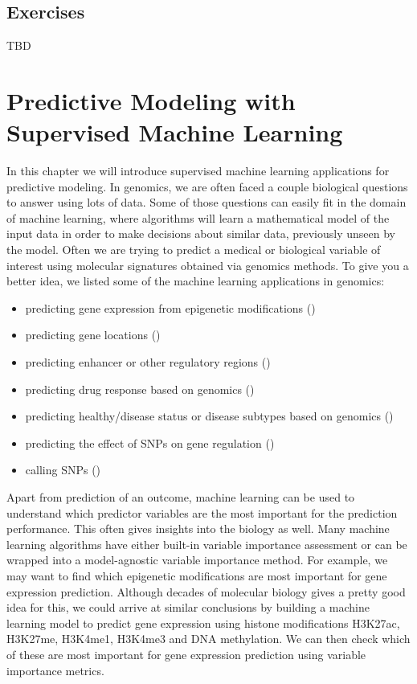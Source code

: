 \documentclass[12pt,]{krantz}
\providecommand{\tightlist}{%
  \setlength{\itemsep}{0pt}\setlength{\parskip}{0pt}}
\begin{document}
\hypertarget{exercises-2}{%
\section{Exercises}\label{exercises-2}}

TBD

\hypertarget{supervisedLearning}{%
\chapter{Predictive Modeling with Supervised Machine Learning}\label{supervisedLearning}}

In this chapter we will introduce supervised machine learning applications for predictive modeling. In genomics, we are often faced a couple biological questions to answer using lots of data. Some of those questions can easily fit in the domain of machine learning, where algorithms will learn a mathematical model of the input data in order to make decisions about similar data, previously unseen by the model. Often we are trying to predict a medical or biological variable of interest using molecular signatures obtained via genomics methods. To give you a better idea, we listed some of the machine learning applications in genomics:

\begin{itemize}
\tightlist
\item
  predicting gene expression from epigenetic modifications (\citet{pmid22950368})
\item
  predicting gene locations (\citet{pmid12364589})
\item
  predicting enhancer or other regulatory regions (\citet{pmid22328731})
\item
  predicting drug response based on genomics (\citet{pmid21428770})
\item
  predicting healthy/disease status or disease subtypes based on genomics (\citet{pmid25750696})
\item
  predicting the effect of SNPs on gene regulation (\citet{pmid26301843})
\item
  calling SNPs (\citet{pmid30247488})
\end{itemize}

Apart from prediction of an outcome, machine learning can be used to understand which predictor variables are the most important for the prediction performance. This often gives insights into the biology as well. Many machine learning algorithms have either built-in variable importance assessment or can be wrapped into a model-agnostic variable importance method. For example, we may want to find which epigenetic modifications are most important for gene expression prediction. Although decades of molecular biology gives a pretty good idea for this, we could arrive at similar conclusions by building a machine learning model to predict gene expression using histone modifications H3K27ac, H3K27me, H3K4me1, H3K4me3 and DNA methylation. We can then check which of these are most important for gene expression prediction using variable importance metrics.
\end{document}
